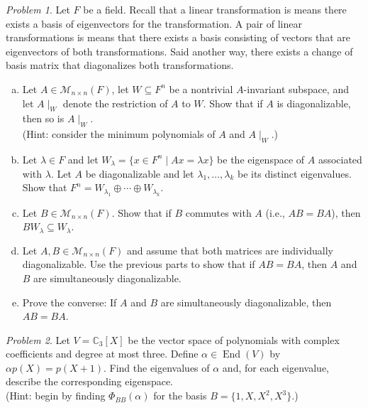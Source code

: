 \documentclass[11pt]{paper}
\theoremstyle{remark}
\newtheorem{problem}{Problem}
\newcommand{\<}{\ensuremath{\langle}}
\renewcommand{\>}{\ensuremath{\rangle}}
\newcommand\fld[1]{\ensuremath{\mathbb{#1}}}
\newcommand\C{\ensuremath{\fld{C}}}
\newcommand\End{\ensuremath{\operatorname{End}}}
\begin{document}
\probskip



\begin{problem}
  Let $F$ be a field. Recall that a linear transformation is 
  means there exists a basis of eigenvectors for the transformation. A pair of
  linear transformations is  means that there
  exists a basis consisting of vectors that are eigenvectors of both
  transformations. Said another way, there exists a change of basis matrix that
  diagonalizes both transformations. 
  \begin{enumerate}[(a)]
  \item Let $A \in \mathcal{M}_{n\times n}(F)$, let $W \subseteq F^n$ be a
    nontrivial $A$-invariant subspace, and let $A{\mid_W}$ denote the restriction of
    $A$ to $W$. Show that if $A$ is diagonalizable, then so is $A{\mid_W}$.\\
    (Hint: consider the minimum polynomials of $A$ and $A{\mid_W}$.)
  \item Let $\lambda \in F$ and let 
    $W_\lambda = \{x \in F^n\mid Ax = \lambda x\}$
    be the eigenspace of $A$ associated with $\lambda$. 
    Let $A$ be diagonalizable and let $\lambda_1, \dots, \lambda_k$ 
    be its distinct eigenvalues. Show that 
    $F^n = W_{\lambda_1} \oplus \cdots \oplus W_{\lambda_k}$.
  \item	Let $B \in \mathcal{M}_{n\times n} (F)$. Show that if $B$ commutes with $A$ 
    (i.e., $A B = BA$), then $B W_\lambda \subseteq W_\lambda$.
  \item Let $A, B \in \mathcal{M}_{n\times n}(F)$ and assume that both matrices
    are individually diagonalizable. Use the previous parts to show that if $A B = B A$,
    then $A$ and $B$ are simultaneously diagonalizable.
    \item Prove the converse: If $A$ and $B$ are simultaneously 
      diagonalizable, then $A B = B A$.%

  \end{enumerate}

\end{problem}



\probskip
\begin{problem}
Let $V = \C_3[X]$ be the vector space of polynomials with complex
coefficients and degree at most three. Define
$\alpha \in \End(V)$ by $\alpha p(X) = p(X + 1)$. 
Find the eigenvalues of $\alpha$ and, for each eigenvalue, 
describe the corresponding eigenspace. \\
(Hint: begin by finding $\Phi_{BB}(\alpha)$ for the basis $B = \{1, X, X^2,X^3\}$.)\\

\end{problem}
\end{document}
